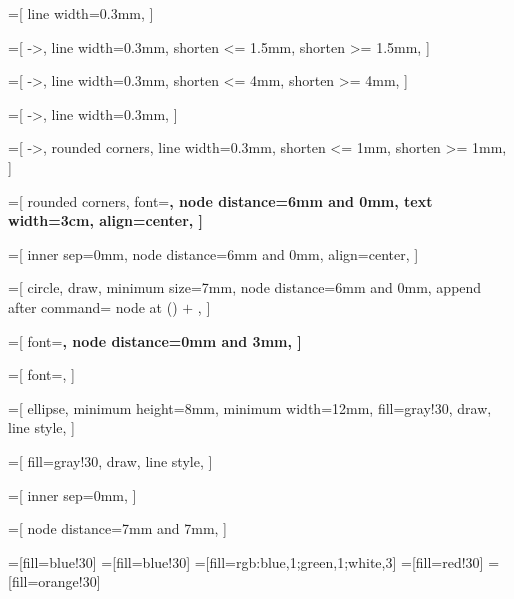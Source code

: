 =[
line width=0.3mm,
]

=[
->,
line width=0.3mm,
shorten <= 1.5mm,
shorten >= 1.5mm,
]

=[
->,
line width=0.3mm,
shorten <= 4mm,
shorten >= 4mm,
]

=[
->,
line width=0.3mm,
]

=[
->,
rounded corners,
line width=0.3mm,
shorten <= 1mm,
shorten >= 1mm,
]


=[
rounded corners,
font=\bfseries,
node distance=6mm and 0mm,
text width=3cm,
align=center,
]

=[
inner sep=0mm,
node distance=6mm and 0mm,
align=center,
]

=[
circle,
draw,
minimum size=7mm,
node distance=6mm and 0mm,
append after command={
node at (\tikzlastnode) {$\textbf{+}$}
},
]


=[
font=\bfseries,
node distance=0mm and 3mm,
]

=[
font=\footnotesize,
]

=[
ellipse,
minimum height=8mm,
minimum width=12mm,
fill=gray!30,
draw,
line style,
]

=[
fill=gray!30,
draw,
line style,
]

=[
inner sep=0mm,
]

=[
node distance=7mm and 7mm,
]


=[fill=blue!30]
=[fill=blue!30]
=[fill={rgb:blue,1;green,1;white,3}]
=[fill=red!30]
=[fill=orange!30]